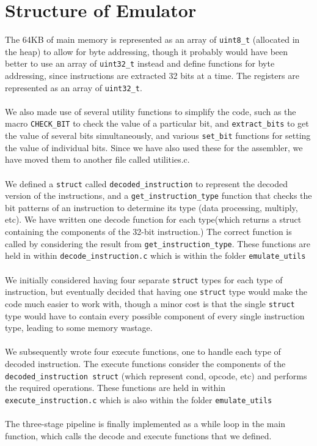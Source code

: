 \documentclass[11pt,twoside]{article}
\begin{document}
\newpage
\section{Structure of Emulator}
The 64KB of main memory is represented as an array of \texttt{uint8\_t} (allocated in the heap) to allow for byte addressing, though it probably would have been better to use an array of \texttt{uint32\_t} instead and define functions for byte addressing, since instructions are extracted 32 bits at a time. The registers are represented as an array of \texttt{uint32\_t}.\\\\
We also made use of several utility functions to simplify the code, such as the macro \texttt{CHECK\_BIT} to check the value of a particular bit, and \texttt{extract\_bits} to get the value of several bits simultaneously, and various \texttt{set\_bit} functions for setting the value of individual bits. Since we have also used these for the assembler, we have moved them to another file called utilities.c.\\\\
We defined a \texttt{struct} called \texttt{decoded\_instruction} to represent the decoded version of the instructions, and a \texttt{get\_instruction\_type} function that checks the bit patterns of an instruction to determine its type (data processing, multiply, etc). We have written one decode function for each type(which returns a struct containing the components of the 32-bit instruction.)  The correct function is called by considering the result from \texttt{get\_instruction\_type}. These functions are held in within \texttt{decode\_instruction.c} which is within the folder \texttt{emulate\_utils} \\\\
We initially considered having four separate \texttt{struct} types for each type of instruction, but eventually decided that having one \texttt{struct} type would make the code much easier to work with, though a minor cost is that the single \texttt{struct} type would have to contain every possible component of every single instruction type, leading to some memory wastage.\\\\
We subsequently wrote four execute functions, one to handle each type of decoded instruction. The execute functions consider the components of the \texttt{decoded\_instruction struct} (which represent cond, opcode, etc) and performs the required operations. These functions are held in within \texttt{execute\_instruction.c} which is also within the folder \texttt{emulate\_utils}\\\\
The three-stage pipeline is finally implemented as a while loop in the main function, which calls the decode and execute functions that we defined. \\
\end{document}
